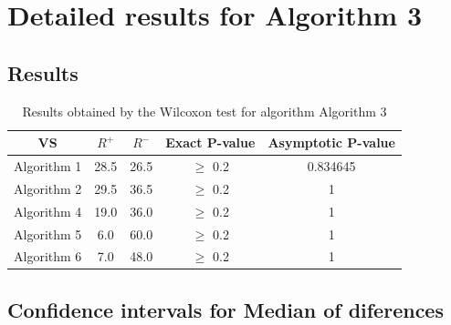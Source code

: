 \documentclass[a4paper,10pt]{article}
\begin{document}
 \clearpage 


\section{Detailed results for Algorithm 3}


\subsection{Results}

\begin{table}[!htp]
\centering\small
\begin{tabular}{
|c|c|c|c|c|}
\hline
 VS & $R^{+}$ & $R^{-}$ & Exact P-value & Asymptotic P-value \\ \hline 
Algorithm 1 & 28.5 & 26.5 & $\geq$ 0.2 & 0.834645\\ \hline 
Algorithm 2 & 29.5 & 36.5 & $\geq$ 0.2 & 1\\ \hline 
Algorithm 4 & 19.0 & 36.0 & $\geq$ 0.2 & 1\\ \hline 
Algorithm 5 & 6.0 & 60.0 & $\geq$ 0.2 & 1\\ \hline 
Algorithm 6 & 7.0 & 48.0 & $\geq$ 0.2 & 1\\ \hline 

\end{tabular}
\caption{Results obtained by the Wilcoxon test for algorithm Algorithm 3}
\end{table}

\subsection{Confidence intervals for Median of diferences}
\end{document}
